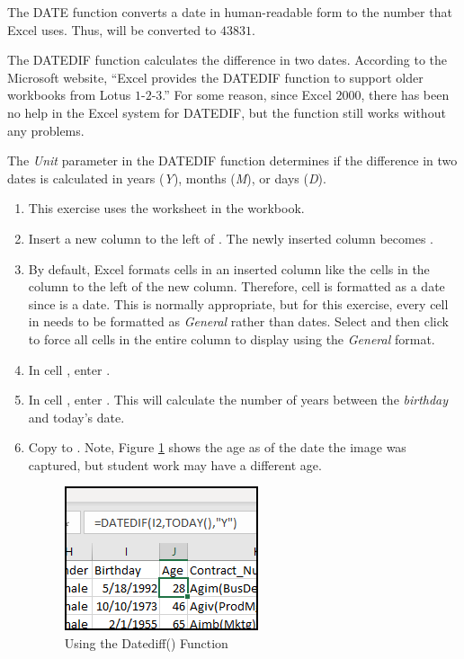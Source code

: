 The DATE function converts a date in human-readable form to the number that Excel uses. Thus,  will be converted to $ 43831 $.

The DATEDIF function calculates the difference in two dates. According to the Microsoft website, ``Excel provides the DATEDIF function to support older workbooks from Lotus $ 1 $-$ 2 $-$ 3 $.'' For some reason, since Excel $ 2000 $, there has been no help in the Excel system for DATEDIF, but the function still works without any problems. 

The \textit{Unit} parameter in the DATEDIF function determines if the difference in two dates is calculated in years (\textit{Y}), months (\textit{M}), or days (\textit{D}).

\begin{enumerate}
	\item This exercise uses the  worksheet in the  workbook.
	\item Insert a new column to the left of . The newly inserted column becomes .
	\item By default, Excel formats cells in an inserted column like the cells in the column to the left of the new column. Therefore, cell  is formatted as a date since  is a date. This is normally appropriate, but for this exercise, every cell in  needs to be formatted as \textit{General} rather than dates. Select  and then click  to force all cells in the entire column to display using the \textit{General} format.
	\item In cell , enter .
	\item In cell , enter . This will calculate the number of years between the \textit{birthday} and today's date. 
	\item Copy  to . Note, Figure \ref{09:fig46} shows the age as of the date the image was captured, but student work may have a different age.
	
	\begin{figure}[H]
		\centering
		\includegraphics[width=\maxwidth{.50\linewidth}]{gfx/ch09_fig46}
		\caption{Using the Datediff() Function}
		\label{09:fig46}
	\end{figure}
	

\end{enumerate}
